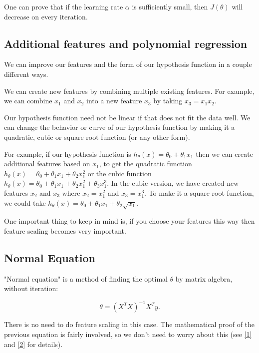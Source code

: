 \documentclass[a4paper,11pt]{report}
\begin{document}
One can prove that if the learning rate $\alpha$ is sufficiently small, then $J(\theta)$ will decrease on every iteration.

\subsection*{Additional features and polynomial regression}

We can improve our features and the form of our hypothesis function in a couple different ways.

We can create new features by combining multiple existing features. For example, we can combine $x_1$ and $x_2$ into a new feature $x_3$ by taking $x_3 = x_1x_2$.

Our hypothesis function need not be linear if that does not fit the data well. We can change the behavior or curve of our hypothesis function by making it a quadratic, cubic or square root function (or any other form).

For example, if our hypothesis function is $h_\theta(x) = \theta_0 + \theta_1 x_1$ then we can create additional features based on $x_1$, to get the quadratic function $h_\theta(x) = \theta_0 + \theta_1 x_1 + \theta_2 x_1^2$ or the cubic function $h_\theta(x) = \theta_0 + \theta_1 x_1 + \theta_2 x_1^2 + \theta_3 x_1^3$. In the cubic version, we have created new features $x_2$ and $x_3$ where $x_2 = x_1^2$ and $x_3 = x_1^3$.
To make it a square root function, we could take $h_\theta(x) = \theta_0 + \theta_1 x_1 + \theta_2 \sqrt{x_1}$.

One important thing to keep in mind is, if you choose your features this way then feature scaling becomes very important.

\subsection*{Normal Equation}

"Normal equation" is a method of finding the optimal $\theta$ by matrix algebra, without iteration:

\begin{equation}\label{eq:mul-reg-neq}
\theta = (X^T X)^{-1}X^T y.
\end{equation}

There is no need to do feature scaling in this case. The mathematical proof of the previous equation is fairly involved, so we don't need to worry about this (see \href{https://en.wikipedia.org/wiki/Linear_least_squares_(mathematics)}{[1]} and \href{http://eli.thegreenplace.net/2014/derivation-of-the-normal-equation-for-linear-regression}{[2]} for details).
\end{document}
